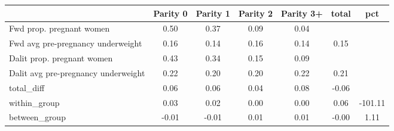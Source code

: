 \begin{tabular}{l*{6}{c}}
\toprule
            &\multicolumn{1}{c}{Parity 0}&\multicolumn{1}{c}{Parity 1}&\multicolumn{1}{c}{Parity 2}&\multicolumn{1}{c}{Parity 3+}&\multicolumn{1}{c}{total}&\multicolumn{1}{c}{pct}\\
\midrule
\midrule
Fwd prop. pregnant women&        0.50&        0.37&        0.09&        0.04&            &            \\
Fwd avg pre-pregnancy underweight&        0.16&        0.14&        0.16&        0.14&        0.15&            \\
Dalit prop. pregnant women&        0.43&        0.34&        0.15&        0.09&            &            \\
Dalit avg pre-pregnancy underweight&        0.22&        0.20&        0.20&        0.22&        0.21&            \\
total\_diff  &        0.06&        0.06&        0.04&        0.08&       -0.06&            \\
within\_group&        0.03&        0.02&        0.00&        0.00&        0.06&     -101.11\\
between\_group&       -0.01&       -0.01&        0.01&        0.01&       -0.00&        1.11\\
\bottomrule
\end{tabular}
